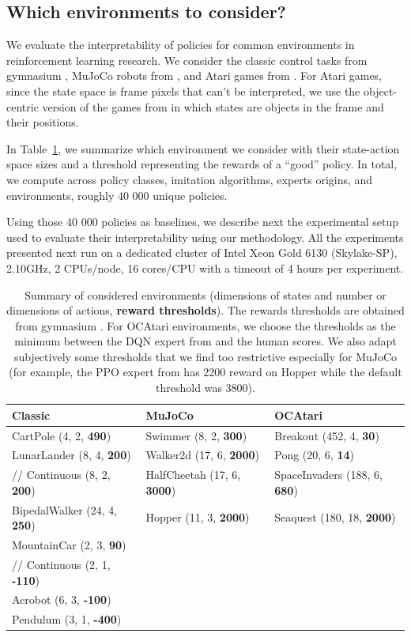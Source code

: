 \subsection{Which environments to consider?}
We evaluate the interpretability of policies for common environments in reinforcement learning research.
We consider the classic control tasks from gymnasium \cite{gymnasium}, MuJoCo robots from \cite{mujoco}, and Atari games from \cite{atari}.
For Atari games, since the state space is frame pixels that can't be interpreted, we use the object-centric version of the games from \cite{ocatari} in which states are objects in the frame and their positions.

In Table~\ref{tab:envs}, we summarize which environment we consider with their state-action space sizes and a threshold representing the rewards of a ``good'' policy.
In total, we compute across policy classes, imitation algorithms, experts origins, and environments, roughly 40 000 unique policies.

Using those 40 000 policies as baselines, we describe next the experimental setup used to evaluate their interpretability using our methodology.
All the experiments presented next run on a dedicated cluster of Intel Xeon Gold 6130 (Skylake-SP), 2.10GHz, 2 CPUs/node, 16 cores/CPU with a timeout of 4 hours per experiment.

\begin{table}[ht]
  \centering
  \small
  \begin{tabular}{lll}
  \hline
  \textbf{Classic} & \textbf{MuJoCo} & \textbf{OCAtari}\\
  \hline
  CartPole (4, 2, \textbf{490}) & Swimmer (8, 2, \textbf{300}) & Breakout (452, 4, \textbf{30})\\
  LunarLander (8, 4, \textbf{200}) & Walker2d (17, 6, \textbf{2000}) & Pong (20, 6, \textbf{14})\\
  //    Continuous (8, 2, \textbf{200}) & HalfCheetah (17, 6, \textbf{3000}) & SpaceInvaders (188, 6, \textbf{680})\\
  BipedalWalker (24, 4, \textbf{250}) & Hopper (11, 3, \textbf{2000}) & Seaquest (180, 18, \textbf{2000})\\
  MountainCar (2, 3, \textbf{90}) & \\
  //    Continuous (2, 1, \textbf{-110}) & \\
  Acrobot (6, 3, \textbf{-100}) & \\
  Pendulum (3, 1, \textbf{-400}) & \\
  \hline
  \end{tabular}
  \caption{Summary of considered environments (dimensions of states and number or dimensions of actions, \textbf{reward thresholds}). The rewards thresholds are obtained from gymnasium \citep{gymnasium}. For OCAtari environments, we choose the thresholds as the minimum between the DQN expert from \citet{zoo} and the human scores. We also adapt subjectively some thresholds that we find too restrictive especially for MuJoCo (for example, the PPO expert from \citet{zoo} has 2200 reward on Hopper while the default threshold was 3800).}
  \label{tab:envs}
  \end{table}



